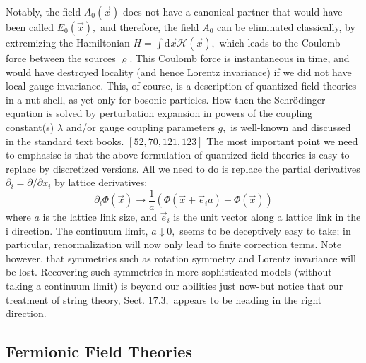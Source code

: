 \documentclass[main.tex]{subfiles}
\begin{document}
Notably, the field $A_{0}(\vec{x})$ does not have a canonical partner that would have been called $E_{0}(\vec{x}),$ and therefore, the field $A_{0}$ can be eliminated classically, by extremizing the Hamiltonian $H=\int \mathrm{d} \vec{x} \mathcal{H}(\vec{x}),$ which leads to the Coulomb force between the sources $\varrho .$ This Coulomb force is instantaneous in time, and would have destroyed locality (and hence Lorentz invariance) if we did not have local gauge invariance. This, of course, is a description of quantized field theories in a nut shell, as yet only for bosonic particles. How then the Schrödinger equation is solved by perturbation expansion in powers of the coupling constant(s) $\lambda$ and/or gauge coupling parameters $g,$ is well-known and discussed in the standard text books. $[52,70,121,123]$
The most important point we need to emphasise is that the above formulation of quantized field theories is easy to replace by discretized versions. All we need to do is replace the partial derivatives $\partial_{i}=\partial / \partial x_{i}$ by lattice derivatives:
$$
\partial_{i} \Phi(\vec{x}) \rightarrow \frac{1}{a}\left(\Phi\left(\vec{x}+\vec{e}_{i} a\right)-\Phi(\vec{x})\right)
$$
where $a$ is the lattice link size, and $\vec{e}_{i}$ is the unit vector along a lattice link in the i direction. The continuum limit, $a \downarrow 0,$ seems to be deceptively easy to take; in particular, renormalization will now only lead to finite correction terms. Note however, that symmetries such as rotation symmetry and Lorentz invariance will be lost. Recovering such symmetries in more sophisticated models (without taking a continuum limit) is beyond our abilities just now-but notice that our treatment of string theory, Sect. $17.3,$ appears to be heading in the right direction.



\subsection{Fermionic Field Theories}\label{ch20.2}
\end{document}
